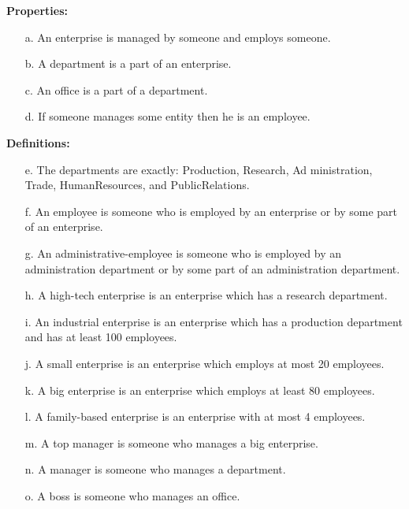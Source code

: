 \documentclass[11pt]{article}
\begin{document}
\noindent\textbf{Properties:}
\begin{itemize}
    \item[a.] An enterprise is managed by someone and employs someone.
    \item[b.] A department is a part of an enterprise.
    \item[c.] An office is a part of a department.
    \item[d.] If someone manages some entity then he is an employee.
\end{itemize} 

\noindent\textbf{Definitions:}

\begin{itemize}
    \item[e.] The departments are exactly: Production, Research, Ad
ministration, Trade, HumanResources, and PublicRelations.
\item[f.] An employee is someone who is employed by an enterprise or by some part of an enterprise.
\item[g.] An administrative-employee is someone who is employed by an administration department or by some part of an administration department.
\item[h.] A high-tech enterprise is an enterprise which has a research department.
\item[i.] An industrial enterprise is an enterprise which has a production department and has at least 100 employees.
\item[j.] A small enterprise is an enterprise which employs at most 20 employees.
\item[k.] A big enterprise is an enterprise which employs at least 80 employees.
\item[l.] A family-based enterprise is an enterprise with at most 4 employees.
\item[m.] A top manager is someone who manages a big enterprise.
\item[n.] A manager is someone who manages a department.
\item[o.] A boss is someone who manages an office.
\end{itemize}
\end{document}
